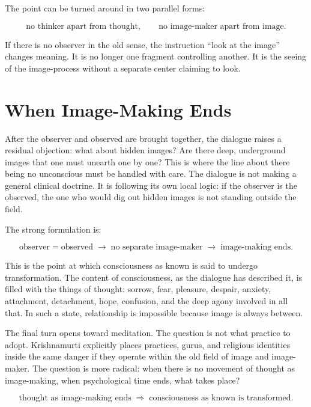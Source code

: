 The point can be turned around in two parallel forms:

\begin{equation}
\text{no thinker apart from thought},
\qquad
\text{no image-maker apart from image}.
\end{equation}

If there is no observer in the old sense, the instruction ``look at the image'' changes meaning. It is no longer one fragment controlling another. It is the seeing of the image-process without a separate center claiming to look.

\section{When Image-Making Ends}

After the observer and observed are brought together, the dialogue raises a residual objection: what about hidden images? Are there deep, underground images that one must unearth one by one? This is where the line about there being no unconscious must be handled with care. The dialogue is not making a general clinical doctrine. It is following its own local logic: if the observer is the observed, the one who would dig out hidden images is not standing outside the field.

The strong formulation is:

\begin{equation}
\text{observer} = \text{observed}
\;\longrightarrow\;
\text{no separate image-maker}
\;\longrightarrow\;
\text{image-making ends}.
\end{equation}

This is the point at which consciousness as known is said to undergo transformation. The content of consciousness, as the dialogue has described it, is filled with the things of thought: sorrow, fear, pleasure, despair, anxiety, attachment, detachment, hope, confusion, and the deep agony involved in all that. In such a state, relationship is impossible because image is always between.

The final turn opens toward meditation. The question is not what practice to adopt. Krishnamurti explicitly places practices, gurus, and religious identities inside the same danger if they operate within the old field of image and image-maker. The question is more radical: when there is no movement of thought as image-making, when psychological time ends, what takes place?

\begin{equation}
\text{thought as image-making ends}
\;\Longrightarrow\;
\text{consciousness as known is transformed}.
\end{equation}

